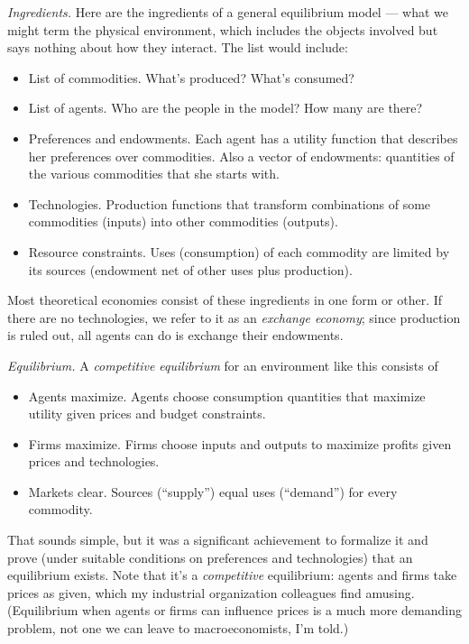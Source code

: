 \documentclass[11pt]{article}
\begin{document}
{\it Ingredients.\/}  Here are the ingredients of a general equilibrium model ---
what we might term the physical environment, which includes
the objects involved but says nothing about how they interact.
The list would include:
%
\begin{itemize}
\item List of commodities.   What's produced?  What's consumed?
\item List of agents.  Who are the people in the model?  How many are there?
\item Preferences and endowments.  Each agent has a utility function
that describes her preferences over commodities.
Also a vector of endowments:  quantities of the various commodities that she starts with.
\item Technologies.  Production functions that transform combinations of some commodities (inputs)
into other commodities (outputs).
\item Resource constraints.  Uses (consumption) of each commodity are limited by
its sources (endowment net of other uses plus production).
\end{itemize}
Most theoretical economies consist of these ingredients in one form or other.
If there are no technologies, we refer to it as an {\it exchange economy\/};
since production is ruled out, all agents can do is exchange their endowments.

{\it Equilibrium.\/}
A {\it competitive equilibrium\/} for an environment like this consists of
%
\begin{itemize}
\item Agents  maximize.
Agents choose consumption quantities that maximize utility given
prices and budget constraints.
\item Firms maximize.
Firms choose inputs and outputs to maximize profits given prices and technologies.
\item Markets clear.
Sources (``supply'') equal uses (``demand'') for every commodity.
\end{itemize}
That sounds simple, but it was a significant achievement to formalize it
and prove (under suitable conditions on preferences and technologies)
that an equilibrium exists.
Note that it's a {\it competitive\/} equilibrium:
agents and firms take prices as given,
which my industrial organization colleagues find amusing.
(Equilibrium when agents or firms can influence prices
is a much more demanding problem,
not one we can leave to macroeconomists, I'm told.)
\end{document}
